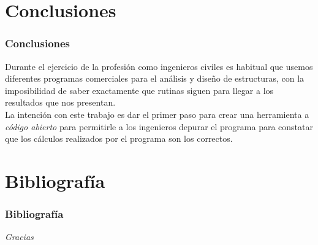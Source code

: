 \documentclass{beamer}
\begin{document}
\section{Conclusiones}
\begin{frame}
  \frametitle{Conclusiones}
  Durante el ejercicio de la profesión como ingenieros civiles es habitual que usemos diferentes programas comerciales para el análisis y diseño de estructuras, con la imposibilidad de saber exactamente que rutinas siguen para llegar a los resultados que nos presentan. \\[2ex]

  La intención con este trabajo es dar el primer paso para crear una herramienta a \emph{código abierto} para permitirle a los ingenieros depurar el programa para constatar que los cálculos realizados por el programa son los correctos.
\end{frame}

\section{Bibliografía}
\begin{frame}
  \frametitle{Bibliografía}
  \printbibliography
\end{frame}

\begin{frame}
  \centering \Large
  \emph{Gracias}
\end{frame}
\end{document}
